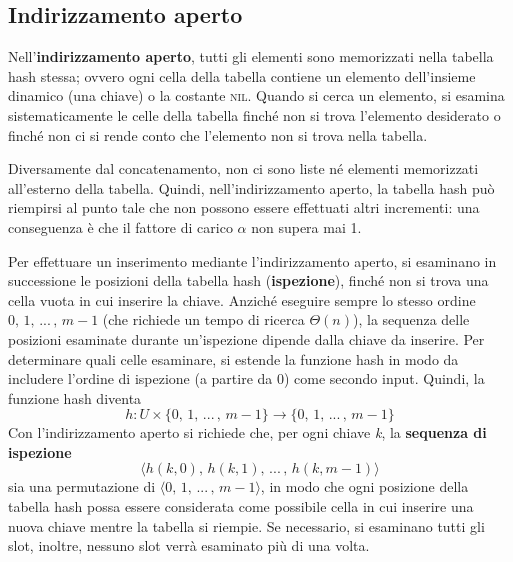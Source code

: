 \documentclass[10pt, a4paper]{report}
\begin{document}
\subsection{Indirizzamento aperto}
Nell'\textbf{indirizzamento aperto}, tutti gli elementi sono memorizzati nella tabella hash stessa; ovvero ogni cella della tabella contiene un elemento dell'insieme dinamico (una chiave) o la costante \textsc{nil}. Quando si cerca un elemento, si esamina sistematicamente le celle della tabella finché non si trova l'elemento desiderato o finché non ci si rende conto che l'elemento non si trova nella tabella.

Diversamente dal concatenamento, non ci sono liste né elementi memorizzati all'esterno della tabella. Quindi, nell'indirizzamento aperto, la tabella hash può riempirsi al punto tale che non possono essere effettuati altri incrementi: una conseguenza è che il fattore di carico $\alpha$ non supera mai 1.

Per effettuare un inserimento mediante l'indirizzamento aperto, si esaminano in successione le posizioni della tabella hash (\textbf{ispezione}), finché non si trova una cella vuota in cui inserire la chiave. Anziché eseguire sempre lo stesso ordine $0,\,1,\,...\,,\,m - 1$ (che richiede un tempo di ricerca $\Theta(n)$), la sequenza delle posizioni esaminate durante un'ispezione dipende dalla chiave da inserire. Per determinare quali celle esaminare, si estende la funzione hash in modo da includere l'ordine di ispezione (a partire da 0) come secondo input. Quindi, la funzione hash diventa
\begin{equation*}
h : U \times \{0,\,1,\,...\,,\,m - 1\} \rightarrow \{0,\,1,\,...\,,\,m - 1\}
\end{equation*}
Con l'indirizzamento aperto si richiede che, per ogni chiave \textit{k}, la \textbf{sequenza di ispezione}
\begin{equation*}
\langle h(k,0),\, h(k,1),\,...\,,\, h(k,m-1)\rangle
\end{equation*}
sia una permutazione di $\langle 0,\,1,\,...\,,\,m - 1  \rangle$, in modo che ogni posizione della tabella hash possa essere considerata come possibile cella in cui inserire una nuova chiave mentre la tabella si riempie. Se necessario, si esaminano tutti gli slot, inoltre, nessuno slot verrà esaminato più di una volta.
\end{document}
